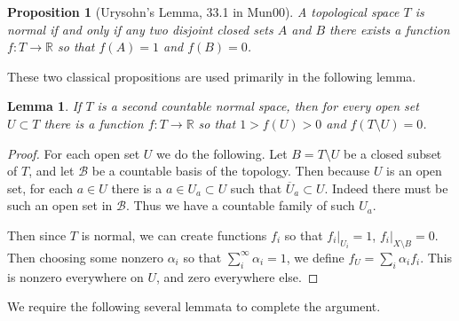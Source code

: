 \documentclass[12pt]{amsart}
\newtheorem{lemma}[theorem]{Lemma}
\newtheorem{proposition}[theorem]{Proposition}
\theoremstyle{definition}
\numberwithin{equation}{section}
\begin{document}
\begin{proposition}[Urysohn's Lemma, 33.1 in Mun00]
    A topological space $T$ is normal if and only if any two disjoint closed sets $A$ and $B$ there exists a function $f: T\rightarrow \mathbb R$ so that $f(A) = 1$ and $f(B) = 0$.
\end{proposition}

These two classical propositions are used primarily in the following lemma. 

\begin{lemma}
    If $T$ is a second countable normal space, then for every open set $U \subset T$ there is a function $f: T \rightarrow \mathbb R$ so that $1 >f(U) > 0$ and $f(T\setminus U) = 0$. 
\end{lemma}
\begin{proof}
    For each open set $U$ we do the following. Let $B = T\setminus U$ be a closed subset of $T$, and let $\mathcal B$ be a countable basis of the topology. Then because $U$ is an open set, for each $a \in U$ there is a $a \in U_a \subset U$ such that $\overline U_a \subset U$. Indeed there must be such an open set in $\mathcal B$. Thus we have a countable family of such $U_a$.

    Then since $T$ is normal, we can create functions $f_i$ so that $f_i|_{U_i} = 1$, $f_i|_{X \setminus B} = 0$. Then choosing some nonzero $\alpha_i$ so that $\sum_i^{\infty}\alpha_i = 1$, we define $f_U = \sum_{i}\alpha_if_i$. This is nonzero everywhere on $U$, and zero everywhere else. 
\end{proof}

We require the following several lemmata to complete the argument. 
\end{document}
